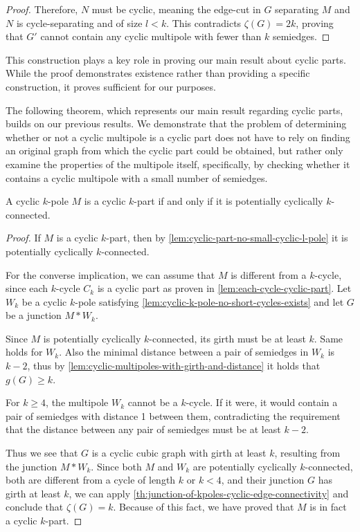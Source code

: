 \documentclass[12pt, twoside]{book}
\begin{document}
\begin{proof}
	Therefore, $N$ must be cyclic, meaning the edge-cut in $G$ separating $M$ and $N$ is cycle-separating and of size $l<k$. This contradicts $\zeta(G)=2k$, proving that $G'$ cannot contain any cyclic multipole with fewer than $k$ semiedges.
\end{proof}

This construction plays a key role in proving our main result about cyclic parts. While the proof demonstrates existence rather than providing a specific construction, it proves sufficient for our purposes.

The following theorem, which represents our main result regarding cyclic parts, builds on our previous results. We demonstrate that the problem of determining whether or not a cyclic multipole is a cyclic part does not have to rely on finding an original graph from which the cyclic part could be obtained, but rather only examine the properties of the multipole itself, specifically, by checking whether it contains a cyclic multipole with a small number of semiedges.

\begin{theorem}\label{th:alternative-definition-of-cyclic-part}
	A cyclic $k$-pole $M$ is a cyclic $k$-part if and only if it is potentially cyclically $k$-connected.
\end{theorem}

\begin{proof}
	If $M$ is a cyclic $k$-part, then by \cref{lem:cyclic-part-no-small-cyclic-l-pole} it is potentially cyclically $k$-connected.
	
	For the converse implication, we can assume that $M$ is different from a $k$-cycle, since each $k$-cycle $C_k$ is a cyclic part as proven in \cref{lem:each-cycle-cyclic-part}. Let $W_k$ be a cyclic $k$-pole satisfying \cref{lem:cyclic-k-pole-no-short-cycles-exists} and let $G$ be a junction $M*W_k$.
	
	Since $M$ is potentially cyclically $k$-connected, its girth must be at least $k$. Same holds for $W_k$. Also the minimal distance between a pair of semiedges in $W_k$ is $k-2$, thus by \cref{lem:cyclic-multipoles-with-girth-and-distance} it holds that $g(G)\geq k$.
	
	For $k\geq 4$, the multipole $W_k$ cannot be a $k$-cycle. If it were, it would contain a pair of semiedges with distance 1 between them, contradicting the requirement that the distance between any pair of semiedges must be at least $k-2$.
	
	Thus we see that $G$ is a cyclic cubic graph with girth at least $k$, resulting from the junction ${M*W_k}$. Since both $M$ and $W_k$ are potentially cyclically \mbox{$k$-connected}, both are different from a cycle of length $k$ or $k<4$, and their junction $G$ has girth at least $k$, we can apply \cref{th:junction-of-kpoles-cyclic-edge-connectivity} and conclude that $\zeta(G)=k$. Because of this fact, we have proved that $M$ is in fact a cyclic $k$-part.
\end{proof}
\end{document}
